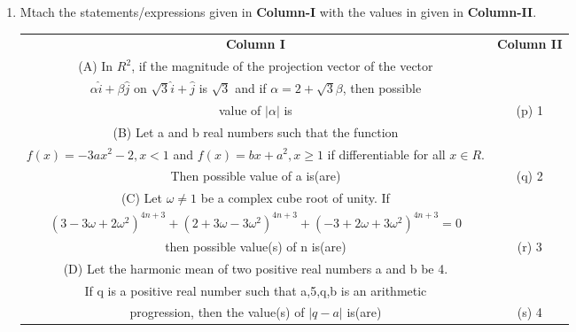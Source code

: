 \begin{enumerate}[label=\arabic*.,ref=\thesubsection.\theenumi]
\item Mtach the statements/expressions given in \textbf{Column-I} with the values in given in \textbf{Column-II}.
\begin{table}[ht!]
\centering
\begin{tabular}{c c} 
 \textbf{Column I} & \textbf{Column II}\\ [0.5ex] 
 (A) In $R^2$, if the magnitude of the projection vector of the vector\\
     $\alpha\hat{i}+\beta\hat{j}$ on $\sqrt{3}\hat{i}+\hat{j}$ is $\sqrt{3}$
     and if $\alpha =2+\sqrt{3}\beta$, then possible\\ value of $|\alpha|$ is                   &(p) 1\\ 
 (B) Let a and b real numbers such that the function\\
     $f(x)=-3ax^2-2, x<1$ and $f(x)=bx+a^2, x \geq 1$ if differentiable for 
     all $x \in R$.\\Then possible value of a is(are)                                           &(q) 2\\
 (C) Let $\omega \neq 1$ be a complex cube root of unity. If\\
     $(3-3\omega+2\omega^2)^{4n+3}+(2+3\omega-3\omega^2)^{4n+3}+
     (-3+2\omega+3\omega^2)^{4n+3}=0$\\ then possible value(s) of n is(are)                     &(r) 3\\
 (D) Let the harmonic mean of two positive real numbers a and b be 4.\\
     If q is a positive real number such that a,5,q,b is an arithmetic\\
     progression, then the value(s) of $|q-a|$ is(are)                                          &(s) 4\\[1ex]
                                                            
\end{tabular}
\end{table}
\clearpage


\end{enumerate}

